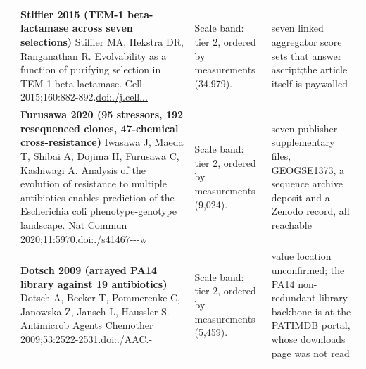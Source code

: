 \begin{landscape}
\begin{longtable}{@{}r@{\hspace{4pt}} L{78mm} L{72mm} L{76mm}@{}}
 & \textbf{Stiffler 2015 (TEM-1 beta-lactamase across seven selections)} \newline Stiffler MA, Hekstra DR, Ranganathan R. Evolvability as a function of purifying selection in TEM-1 beta-lactamase. Cell 2015;160:882-892.\newline \href{https://doi.org/10.1016/j.cell.2015.01.035}{doi:./\allowbreak j.\allowbreak cell...} & Scale band: tier 2, ordered by measurements (34,979). & seven li\allowbreak nked agg\allowbreak regator \allowbreak score se\allowbreak ts that \allowbreak answer a\allowbreak  script;\allowbreak  the art\allowbreak icle its\allowbreak elf is p\allowbreak aywalled \\
 & \textbf{Furusawa 2020 (95 stressors, 192 resequenced clones, 47-chemical cross-resistance)} \newline Iwasawa J, Maeda T, Shibai A, Dojima H, Furusawa C, Kashiwagi A. Analysis of the evolution of resistance to multiple antibiotics enables prediction of the Escherichia coli phenotype-genotype landscape. Nat Commun 2020;11:5970.\newline \href{https://doi.org/10.1038/s41467-020-19713-w}{doi:./\allowbreak s41467---\allowbreak w} & Scale band: tier 2, ordered by measurements (9,024). & seven pu\allowbreak blisher \allowbreak suppleme\allowbreak ntary fi\allowbreak les, GEO\allowbreak  GSE1373, a se\allowbreak quence a\allowbreak rchive d\allowbreak eposit a\allowbreak nd a Zen\allowbreak odo reco\allowbreak rd, all \allowbreak reachabl\allowbreak e \\
 & \textbf{Dotsch 2009 (arrayed PA14 library against 19 antibiotics)} \newline Dotsch A, Becker T, Pommerenke C, Janowska Z, Jansch L, Haussler S. Antimicrob Agents Chemother 2009;53:2522-2531.\newline \href{https://doi.org/10.1128/AAC.00035-09}{doi:./\allowbreak AAC.-} & Scale band: tier 2, ordered by measurements (5,459). & value lo\allowbreak cation u\allowbreak nconfirm\allowbreak ed; the \allowbreak PA14 non\allowbreak -\allowbreak redunda\allowbreak nt libra\allowbreak ry backb\allowbreak one is a\allowbreak t the PA\allowbreak TIMDB po\allowbreak rtal, wh\allowbreak ose down\allowbreak loads pa\allowbreak ge was n\allowbreak ot read \\

\end{longtable}
\end{landscape}
